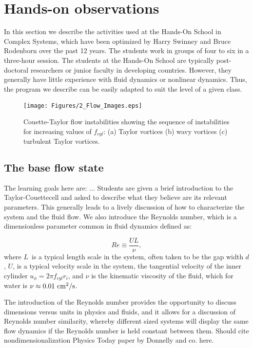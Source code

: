\documentclass[%
reprint,
 amsmath,amssymb,
 aps,
prb,
floatfix,
longbibliography,
notitlepage
]{revtex4-1}
\newcommand{\BE}{\begin{equation}}
\newcommand{\EE}{\end{equation}}
\newcommand{\DB}[1]{{\color{red}#1}} %
\newcommand{\TC}{Taylor-Couette}
\newcommand{\vel}{\ensuremath{u}} %
\newcommand{\vscale}{\ensuremath{U}} %
\newcommand{\lscale}{\ensuremath{L}} %
\newcommand{\visc}{\ensuremath{\nu}} %
\newcommand{\gap}{\ensuremath{d}} %
\newcommand{\rad}[1]{\ensuremath{r_{#1}}} %
\newcommand{\ReN}{\ensuremath{Re}} %
\begin{document}
\section{Hands-on observations}
In this section we describe the activities used at the Hands-On School in Complex Systems, which have been optimized by Harry Swinney and Bruce Rodenborn over the past 12 years. The students work in groups of four to six in a three-hour session. The students at the Hands-On School are typically post-doctoral researchers or junior faculty in developing countries. However, they generally have little experience with fluid dynamics or nonlinear dynamics. Thus, the program we describe can be easily adapted to suit the level of a given class.

\begin{figure}[ht]
  \centering
    \texttt{[image: Figures/2\_Flow\_Images.eps]}
    \caption{Couette-Taylor flow instabilities showing the sequence of instabilities for increasing values of $f_{cyl}$: (a) Taylor vortices (b) wavy vortices (c) turbulent Taylor vortices.}\label{fig:flow_patterns}
\end{figure}

\subsection{The base flow state}
The learning goals here are: ...
Students are given a brief introduction to the \TC cell and asked to describe what they believe are its relevant parameters. This generally leads to a lively discussion of how to characterize the system and the fluid flow. We also introduce the Reynolds number, which is a dimensionless parameter common in fluid dynamics defined as:

\BE
\ReN\equiv \frac{\vscale\lscale}{\visc},
\EE
where \lscale\ is a typical length scale in the system, often taken to be the gap width \gap, \vscale, is a typical velocity scale in the system, the tangential velocity of the inner cylinder $\vel_\phi=2\pi f_{cyl}\rad{i}$, and $\nu$ is the kinematic viscosity of the fluid, which for water is $\visc\approx 0.01~\rm cm^2/ s$.\cite{fluids_general}

The introduction of the Reynolds number provides the opportunity to discuss dimensions versus units in physics and fluids, and it allows for a discussion of Reynolds number similarity, whereby different sized systems will display the same flow dynamics if the Reynolds number is held constant between them.\cite{fluids_general} \DB{Should cite nondimensionalization Physics Today paper by Donnelly and co. here.}
\end{document}
